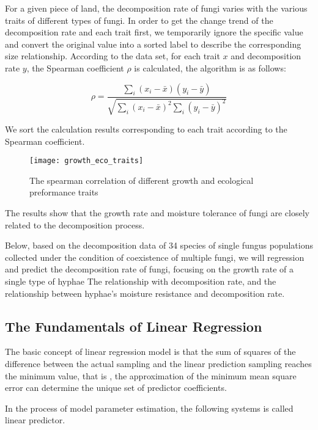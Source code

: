 \documentclass{mcmthesis}
\begin{document}
For a given piece of land, the decomposition rate of fungi varies with the various traits of different types of fungi. In order to get the change trend of the decomposition rate and each trait first, we temporarily ignore the specific value and convert the original value into a sorted label to describe the corresponding size relationship. According to the data set, for each trait $ x $ and decomposition rate $ y $, the Spearman coefficient $ \rho $ is calculated, the algorithm is as follows: 

\begin{equation}
  \rho=\frac{\sum_{i}\left(x_{i}-\bar{x}\right)\left(y_{i}-\bar{y}\right)}{\sqrt{\sum_{i}\left(x_{i}-\bar{x}\right)^{2} \sum_{i}\left(y_{i}-\bar{y}\right)^{2}}}
\end{equation}

We sort the calculation results corresponding to each trait according to the Spearman coefficient. 

\begin{figure}[h]
  \small
  \centering
  \texttt{[image: growth\_eco\_traits]}
  \caption{The spearman correlation of different growth and ecological preformance traits}
  \label{growth_eco_traits}
\end{figure}

The results show that the growth rate and moisture tolerance of fungi are closely related to the decomposition process. 

Below, based on the decomposition data of 34 species of single fungus populations collected under the condition of coexistence of multiple fungi, we will regression and predict the decomposition rate of fungi, focusing on the growth rate of a single type of hyphae The relationship with decomposition rate, and the relationship between hyphae's moisture resistance and decomposition rate. 

\subsection{The Fundamentals of Linear Regression}

The basic concept of linear regression model is that the sum of squares of the difference between the actual sampling and the linear prediction sampling reaches the minimum value, that is , the approximation of the minimum mean square error can determine the unique set of predictor coefficients.\cite{cao2009linear}

In the process of model parameter estimation, the following systems is called linear predictor.
\end{document}

